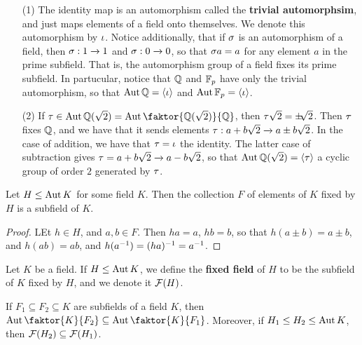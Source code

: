 \begin{example}\label{example_2.1}
    \begin{enumerate}
        \item[(1)] The identity map is an automorphism called the
            \textbf{trivial automorphsim}, and just maps elements of a field
            onto themselves. We denote this automorphism by $\iota$. Notice
            additionally, that if $\sigma$ is an automorphism of a field, then
            $\sigma:1 \xrightarrow{} 1$ and $\sigma:0 \xrightarrow{} 0$, so that $\sigma
            a=a$ for any element  $a$ in the prime subfield. That is, the
            automorphism group of a field fixes its prime subfield. In
            partucular, notice that $\mathbb{Q}$ and  $\mathbb{F}_p$ have only the trivial
            automorphism, so that  $\operatorname{Aut}{\mathbb{Q}}=\langle \iota \rangle$ and
            $\operatorname{Aut}{\mathbb{F}_p}=\langle \iota \rangle$.

        \item[(2)] If $\t \in
            \Aut{\Q(\sqrt{2})}=\Aut{\faktor{\Q(\sqrt{2})}{\Q}}$, then
            $\tau\sqrt{{2}}=\pm\sqrt[]{2}$. Then $\tau$ fixes $\mathbb{Q}$, and we have
            that it sends elements $\tau:a+b\sqrt{2} \xrightarrow{} a \pm
            b\sqrt{2}$. In the case of addition, we have that $\tau=\iota$ the
            identity. The latter case of subtraction gives  $\tau=a+b\sqrt{2}
            \xrightarrow{} a-b\sqrt{2}$, so that
            $\operatorname{Aut}{\mathbb{Q}(\sqrt{2})}=\langle \tau \rangle$ a cyclic group of order
            $2$ generated by  $\tau$.
    \end{enumerate}
\end{example}

\begin{lemma}\label{2.1.3}
    Let $H \leq \operatorname{Aut}{K}$ for some field $K$. Then the collection  $F$ of
    elements of  $K$ fixed by $H$ is a subfield of $K$.
\end{lemma}
\begin{proof}
    LEt $h \in H$, and $a,b \in F$. Then $ha=a$,  $hb=b$, so that  $h(a \pm b)=a
    \pm b$, and $h(ab)=ab$, and $h(a^{-1})=(ha)^{-1}=a^{-1}$.
\end{proof}

\begin{definition}
    Let $K$ be a field. If $H \leq \operatorname{Aut}{K}$, we define the \textbf{fixed field}
    of $H$ to be the subfield of $K$ fixed by  $H$, and we denote it  $\mathcal{F}(H)$.
\end{definition}

\begin{lemma}\label{2.1.4}
    If $F_1 \subseteq F_2 \subseteq K$ are subfields of a field $K$, then
    $\Aut{\faktor{K}{F_2}} \subseteq \Aut{\faktor{K}{F_1}}$. Moreover,
    if $H_1 \leq H_2 \leq \operatorname{Aut}{K}$, then $\mathcal{F}(H_2) \subseteq \mathcal{F}(H_1)$.
\end{lemma}

